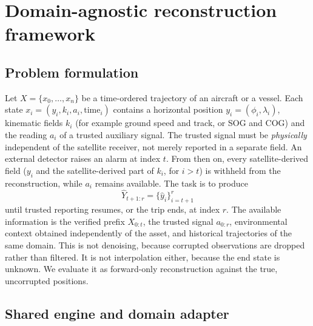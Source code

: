 \section{Domain-agnostic reconstruction framework}
\label{sec:framework}

\subsection{Problem formulation}
\label{sec:problem}

Let $X = \{x_0, \ldots, x_n\}$ be a time-ordered trajectory of an aircraft or
a vessel. Each state $x_i = (y_i, k_i, a_i, \mathrm{time}_i)$ contains a
horizontal position $y_i = (\phi_i, \lambda_i)$, kinematic fields $k_i$ (for
example ground speed and track, or SOG and COG) and the reading $a_i$ of a
trusted auxiliary signal. The trusted signal must be \emph{physically}
independent of the satellite receiver, not merely reported in a separate
field. An external detector raises an alarm at index $t$. From then on,
every satellite-derived field ($y_i$ and the satellite-derived part of
$k_i$, for $i > t$) is withheld from the reconstruction, while $a_i$ remains
available. The task is to produce
\begin{equation}
\hat{Y}_{t+1:r} = \{\hat{y}_i\}_{i=t+1}^{r}
\label{eq:task}
\end{equation}
until trusted reporting resumes, or the trip ends, at index $r$. The
available information is the verified prefix $X_{0:t}$, the trusted signal
$a_{0:r}$, environmental context obtained independently of the asset, and
historical trajectories of the same domain. This is not denoising, because
corrupted observations are dropped rather than filtered. It is not
interpolation either, because the end state is unknown. We evaluate it as
forward-only reconstruction against the true, uncorrupted positions.

\subsection{Shared engine and domain adapter}

